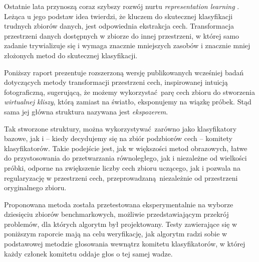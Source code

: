 Ostatnie lata przynoszą coraz szybszy rozwój nurtu \emph{representation learning} \cite{Bengio2012}. Leżąca u jego podstaw idea twierdzi, że kluczem do skutecznej klasyfikacji trudnych zbiorów danych, jest odpowiednia ekstrakcja cech. Transformacja przestrzeni danych dostępnych w zbiorze do innej przestrzeni, w której samo zadanie trywializuje się i wymaga znacznie mniejszych zasobów i znacznie mniej złożonych metod do skutecznej klasyfikacji. 

Poniższy raport prezentuje rozszerzoną wersję publikowanych wcześniej badań dotyczących metody transformacji przestrzeni cech, inspirowanej intuicją fotograficzną, sugerującą, że możemy wykorzystać parę cech zbioru do stworzenia \emph{wirtualnej kliszy}, którą zamiast na światło, eksponujemy na wiązkę próbek. Stąd sama jej główna struktura nazywana jest \emph{ekspozerem}.

Tak stworzone struktury, można wykorzystywać zarówno jako klasyfikatory bazowe, jak i -- kiedy decydujemy się na zbiór podzbiorów cech -- komitety klasyfikatorów. Takie podejście jest, jak w większości metod obrazowych, łatwe do przystosowania do przetwarzania równoległego, jak i niezależne od wielkości próbki, odporne na zwiększenie liczby cech zbioru uczącego, jak i pozwala na regularyzację w przestrzeni cech, przeprowadzaną niezależnie od przestrzeni oryginalnego zbioru.

Proponowana metoda została przetestowana eksperymentalnie na wyborze dziesięciu zbiorów benchmarkowych, możliwie przedstawiającym przekrój problemów, dla których algorytm był projektowany. Testy zawierające się w poniższym raporcie mają na celu weryfikację, jak algorytm radzi sobie w podstawowej metodzie głosowania wewnątrz komitetu klasyfikatorów, w której każdy członek komitetu oddaje głos o tej samej wadze.
